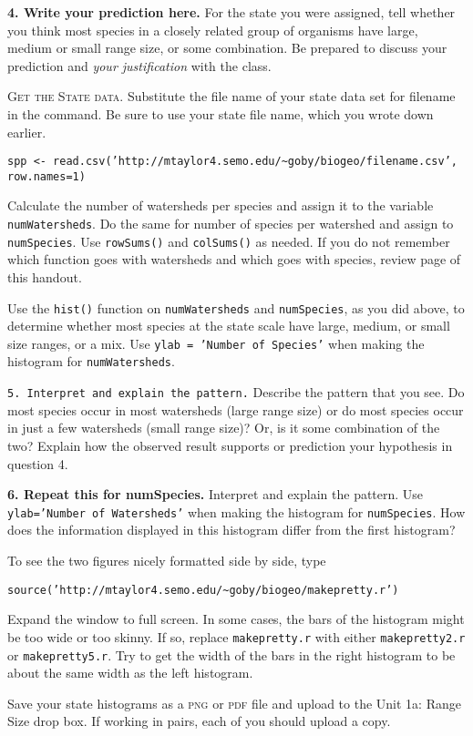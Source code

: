 \documentclass[11pt]{article}
\begin{document}
\textbf{4. Write your prediction here.} For the state you were assigned, 
tell whether you think most species in a closely related
group of organisms have large, medium or small range size, or some
combination. Be prepared to discuss your prediction and \emph{your
justification} with the class.

\vspace{7\baselineskip}

\textsc{Get the State data.} Substitute the file name of your state data set for filename in
the command. Be sure to use your state file name, which you wrote down
earlier.

\texttt{spp \textless{}-
read.csv('http://mtaylor4.semo.edu/\textasciitilde{}goby/biogeo/filename.csv', row.names=1)}

Calculate the number of watersheds per species and assign it to the
variable \texttt{numWatersheds}. Do the same for number of species per
watershed and assign to \texttt{numSpecies}. Use \texttt{rowSums()} and
\texttt{colSums()} as needed. If you do not remember which function goes
with watersheds and which goes with species, review page \pageref{tab:colrowsums} of this handout.

Use the \texttt{hist()} function on \texttt{numWatersheds} and \texttt{numSpecies}, as you did above,
to determine whether most species at the state scale have large, medium, or
small size ranges, or a mix.  Use \texttt{ylab = 'Number of Species'} when making the histogram
for \texttt{numWatersheds}. 

\texttt{5. Interpret and explain the pattern.} Describe the pattern that you see. Do most
species occur in most watersheds (large range size) or do most species
occur in just a few watersheds (small range size)? Or, is it some
combination of the two? Explain how the observed result supports or
prediction your hypothesis in question 4.

\vspace{7\baselineskip}


\textbf{6. Repeat this for numSpecies.} Interpret and explain the pattern. 
Use \texttt{ylab='Number of Watersheds'} when making the histogram for \texttt{numSpecies}.
How does the information displayed in this histogram differ from the first histogram?

\vspace{7\baselineskip}

To see the two figures nicely formatted side by side, type

\texttt{source('http://mtaylor4.semo.edu/\textasciitilde{}goby/biogeo/makepretty.r')}

Expand the window to full screen. In some cases, the bars of the histogram might be too wide or too skinny. If so, replace \texttt{makepretty.r} with either \texttt{makepretty2.r} or \texttt{makepretty5.r}. Try to get the width of the bars in the right histogram to be about the same width as the left histogram.

Save your state histograms as a \textsc{png} or \textsc{pdf} file and upload to the Unit 1a: Range Size drop box. If working in pairs, each of you should upload a copy.
\end{document}
